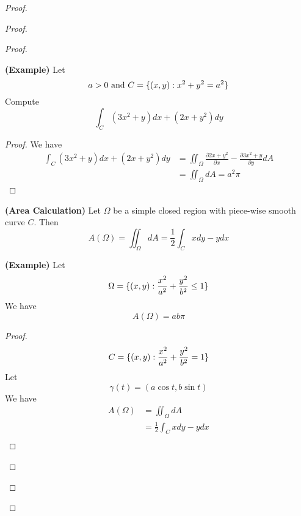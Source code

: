 \documentclass{report}
\begin{document}
\begin{proof}
\begin{proof}
\begin{proof}
\begin{theorem}
\label{7.3.8}
\textbf{(Example)} Let
\begin{equation}
a>0\text{ and }C=\{ (x,y):x^2+y^2=a^2 \}
\end{equation}
Compute
\begin{equation}
\int_C (3x^2+y)dx+(2x+y^2)dy
\end{equation}
\end{theorem}
\begin{proof}
We have
\begin{align}
\int_C (3x^2+y)dx+(2x+y^2)dy&=\iint_\Omega \frac{\partial 2x+y^2}{\partial x}-\frac{\partial 3x^2+y}{\partial y} dA\\
&=\iint_{\Omega} dA=a^2\pi
\end{align}
\end{proof}
\begin{theorem}
\label{7.3.9}
\textbf{(Area Calculation)} Let $\Omega$ be a simple closed region with piece-wise smooth curve $C$. Then
 \begin{equation}
A(\Omega)=\iint_{\Omega} dA=\frac{1}{2}\int_C xdy-ydx 
\end{equation}
\end{theorem}
\begin{theorem}
\label{7.3.10}
\textbf{(Example)} Let 
\begin{equation}
\Omega=\{ (x,y):\frac{x^2}{a^2}+\frac{y^2}{b^2}\leq 1 \}
\end{equation}
We have
\begin{equation}
A(\Omega)=ab\pi
\end{equation}
\end{theorem}
\begin{proof}
\begin{equation}
C=\{ (x,y):\frac{x^2}{a^2}+\frac{y^2}{b^2}=1 \}
\end{equation}
Let
\begin{equation}
\gamma (t)=(a\cos t,b\sin t)
\end{equation}
We have
\begin{align}
A(\Omega)&= \iint_{\Omega}dA\\
&=\frac{1}{2}\int_C xdy-ydx\\

\end{align}
\end{proof}
\end{proof}
\end{proof}
\end{proof}
\end{document}

